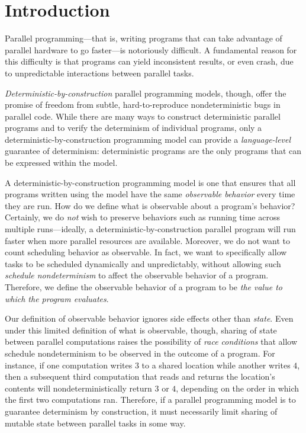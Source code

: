 \chapter{Introduction}\label{ch:intro} %

Parallel programming---that is, writing programs that can take
advantage of parallel hardware to go faster---is notoriously
difficult.  A fundamental reason for this difficulty is that programs
can yield inconsistent results, or even crash, due to unpredictable
interactions between parallel tasks.

\emph{Deterministic-by-construction} parallel programming models,
though, offer the promise of freedom from subtle, hard-to-reproduce
nondeterministic bugs in parallel code.  While there are many ways to
construct deterministic parallel programs and to verify the
determinism of individual programs, only a
deterministic-by-construction programming model can provide a
\emph{language-level} guarantee of determinism: deterministic programs
are the only programs that can be expressed within the model.

A deterministic-by-construction programming model is one that ensures
that all programs written using the model have the same
\emph{observable behavior} every time they are run.  How do we define
what is observable about a program's behavior?  Certainly, we do
\emph{not} wish to preserve behaviors such as running time across
multiple runs---ideally, a deterministic-by-construction parallel
program will run faster when more parallel resources are available.
Moreover, we do not want to count scheduling behavior as observable.
In fact, we want to specifically allow tasks to be scheduled
dynamically and unpredictably, without allowing such \emph{schedule
  nondeterminism} to affect the observable behavior of a program.
Therefore, we define the observable behavior of a program to be
\emph{the value to which the program evaluates}.


Our definition of observable behavior ignores side effects other than
\emph{state}.  Even under this limited definition of what is
observable, though, sharing of state between parallel computations
raises the possibility of \emph{race conditions} that allow schedule
nondeterminism to be observed in the outcome of a program.  For
instance, if one computation writes $3$ to a shared location while
another writes $4$, then a subsequent third computation that reads and
returns the location's contents will nondeterministically return $3$
or $4$, depending on the order in which the first two computations
ran.  Therefore, if a parallel programming model is to guarantee
determinism by construction, it must necessarily limit sharing of
mutable state between parallel tasks in some way.

